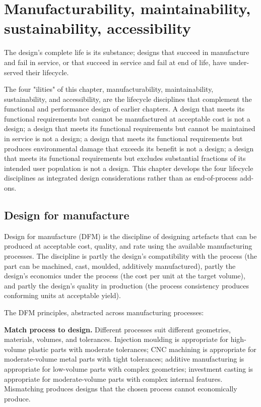 \chapter{Manufacturability, maintainability, sustainability, accessibility}
\label{vol11:ch10}

\epigraph{The design's complete life is its substance; designs that succeed in manufacture and fail in service, or that succeed in service and fail at end of life, have under-served their lifecycle.}{}


\noindent
The four "ilities" of this chapter, manufacturability, maintainability, sustainability, and accessibility, are the lifecycle disciplines that complement the functional and performance design of earlier chapters. A design that meets its functional requirements but cannot be manufactured at acceptable cost is not a design; a design that meets its functional requirements but cannot be maintained in service is not a design; a design that meets its functional requirements but produces environmental damage that exceeds its benefit is not a design; a design that meets its functional requirements but excludes substantial fractions of its intended user population is not a design. This chapter develops the four lifecycle disciplines as integrated design considerations rather than as end-of-process add-ons.

\section{Design for manufacture}

Design for manufacture (DFM) is the discipline of designing artefacts that can be produced at acceptable cost, quality, and rate using the available manufacturing processes. The discipline is partly the design's compatibility with the process (the part can be machined, cast, moulded, additively manufactured), partly the design's economics under the process (the cost per unit at the target volume), and partly the design's quality in production (the process consistency produces conforming units at acceptable yield).

The DFM principles, abstracted across manufacturing processes:

\textbf{Match process to design.} Different processes suit different geometries, materials, volumes, and tolerances. Injection moulding is appropriate for high-volume plastic parts with moderate tolerances; CNC machining is appropriate for moderate-volume metal parts with tight tolerances; additive manufacturing is appropriate for low-volume parts with complex geometries; investment casting is appropriate for moderate-volume parts with complex internal features. Mismatching produces designs that the chosen process cannot economically produce.

